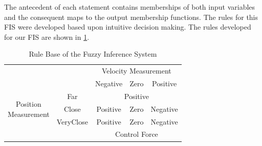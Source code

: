 The antecedent of each statement contains memberships of both input variables and the consequent maps to the
output membership functions. The rules for this FIS were developed based upon intuitive decision making. The
rules developed for our FIS are shown in \cref{tab:rulebase}.  
\begin{table}[ht]
    \begin{center}
        \caption{Rule Base of the Fuzzy Inference System}\label{tab:rulebase}
        \begin{tabular}{ccccc} \multicolumn{2}{c}{}  & \multicolumn{3}{c}{Velocity Measurement}\\ \cline{3-5}
            \multicolumn{2}{c|}{}  & \multicolumn{1}{c|}{Negative} & \multicolumn{1}{c|}{Zero} &
            \multicolumn{1}{c|}{Positive} \\ \cline{2-5}
            \multicolumn{1}{c|}{\multirow{3}{*}{\parbox{3cm}{\centering Position\\Measurement}}} &
            \multicolumn{1}{c|}{Far} & \multicolumn{3}{c|}{Positive} \\ \cline{2-5} \multicolumn{1}{c|}{} &
            \multicolumn{1}{c|}{Close} & \multicolumn{1}{c|}{Positive} & \multicolumn{1}{c|}{Zero} &
            \multicolumn{1}{c|}{Negative}\\ \cline{2-5} \multicolumn{1}{c|}{} & \multicolumn{1}{c|}{VeryClose}
                                                                              & \multicolumn{1}{c|}{Positive}
                                                                              & \multicolumn{1}{c|}{Zero} &
            \multicolumn{1}{c|}{Negative} \\ \cline{2-5} \multicolumn{2}{c}{}  & \multicolumn{3}{c}{Control
            Force}
        \end{tabular}
    \end{center}
\end{table}


